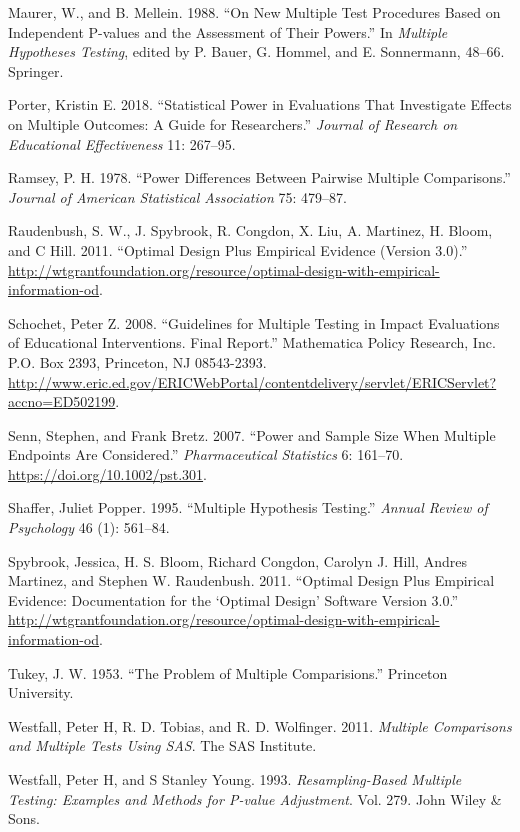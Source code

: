 \documentclass{article}
\newlength{\cslhangindent}
\newlength{\cslentryspacingunit} %
\newenvironment{CSLReferences}[2] %
 {%
  \setlength{\parindent}{0pt}
  \ifodd #1
  \let\oldpar\par
  \def\par{\hangindent=\cslhangindent\oldpar}
  \fi
  \setlength{\parskip}{#2\cslentryspacingunit}
 }%
 {}
\begin{document}
\begin{CSLReferences}{1}{0}
\leavevmode{}%
Maurer, W., and B. Mellein. 1988. {``On New Multiple Test Procedures
Based on Independent {P-values} and the Assessment of Their Powers.''}
In \emph{Multiple Hypotheses Testing}, edited by P. Bauer, G. Hommel,
and E. Sonnermann, 48--66. Springer.

\leavevmode{}%
Porter, Kristin E. 2018. {``Statistical Power in Evaluations That
Investigate Effects on Multiple Outcomes: A Guide for Researchers.''}
\emph{Journal of Research on Educational Effectiveness} 11: 267--95.

\leavevmode{}%
Ramsey, P. H. 1978. {``Power Differences Between Pairwise Multiple
Comparisons.''} \emph{Journal of American Statistical Association} 75:
479--87.

\leavevmode{}%
Raudenbush, S. W., J. Spybrook, R. Congdon, X. Liu, A. Martinez, H.
Bloom, and C Hill. 2011. {``Optimal Design Plus Empirical Evidence
(Version 3.0).''}
\url{http://wtgrantfoundation.org/resource/optimal-design-with-empirical-information-od}.

\leavevmode{}%
Schochet, Peter Z. 2008. {``Guidelines for Multiple Testing in Impact
Evaluations of Educational Interventions. Final Report.''} Mathematica
Policy Research, Inc. P.O. Box 2393, Princeton, NJ 08543-2393.
\url{http://www.eric.ed.gov/ERICWebPortal/contentdelivery/servlet/ERICServlet?accno=ED502199}.

\leavevmode{}%
Senn, Stephen, and Frank Bretz. 2007. {``Power and Sample Size When
Multiple Endpoints Are Considered.''} \emph{Pharmaceutical Statistics}
6: 161--70. \url{https://doi.org/10.1002/pst.301}.

\leavevmode{}%
Shaffer, Juliet Popper. 1995. {``Multiple Hypothesis Testing.''}
\emph{Annual Review of Psychology} 46 (1): 561--84.

\leavevmode{}%
Spybrook, Jessica, H. S. Bloom, Richard Congdon, Carolyn J. Hill, Andres
Martinez, and Stephen W. Raudenbush. 2011. {``Optimal Design Plus
Empirical Evidence: Documentation for the {`Optimal Design'} Software
Version 3.0.''}
\url{http://wtgrantfoundation.org/resource/optimal-design-with-empirical-information-od}.

\leavevmode{}%
Tukey, J. W. 1953. {``The Problem of Multiple Comparisions.''} Princeton
University.

\leavevmode{}%
Westfall, Peter H, R. D. Tobias, and R. D. Wolfinger. 2011.
\emph{Multiple Comparisons and Multiple Tests Using SAS}. The SAS
Institute.

\leavevmode{}%
Westfall, Peter H, and S Stanley Young. 1993. \emph{Resampling-Based
Multiple Testing: Examples and Methods for {P-value} Adjustment}. Vol.
279. John Wiley \& Sons.

\end{CSLReferences}
\end{document}
